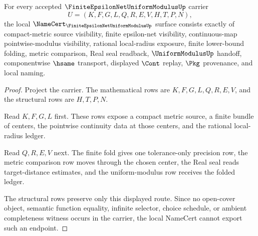 \begin{theorem}
\label{thm:finite-epsilon-net-uniform-modulus-namecert-obligations}
For every accepted $\FiniteEpsilonNetUniformModulusUp$ carrier
$$
U=(K,F,G,L,Q,R,E,V,H,T,P,N),
$$
the local $\NameCert_{\FiniteEpsilonNetUniformModulusUp}$ surface consists exactly of compact-metric source visibility, finite epsilon-net visibility, continuous-map pointwise-modulus visibility, rational local-radius exposure, finite lower-bound folding, metric comparison, Real seal readback, $\UniformModulusUp$ handoff, componentwise $\hsame$ transport, displayed $\Cont$ replay, $\Pkg$ provenance, and local naming.
\end{theorem}
\begin{proof}
Project the carrier. The mathematical rows are $K,F,G,L,Q,R,E,V$, and the structural rows are $H,T,P,N$.

Read $K,F,G,L$ first. These rows expose a compact metric source, a finite bundle of centers, the pointwise continuity data at those centers, and the rational local-radius ledger.

Read $Q,R,E,V$ next. The finite fold gives one tolerance-only precision row, the metric comparison row moves through the chosen center, the Real seal reads target-distance estimates, and the uniform-modulus row receives the folded ledger.

The structural rows preserve only this displayed route. Since no open-cover object, semantic function equality, infinite selector, choice schedule, or ambient completeness witness occurs in the carrier, the local NameCert cannot export such an endpoint.
\end{proof}

